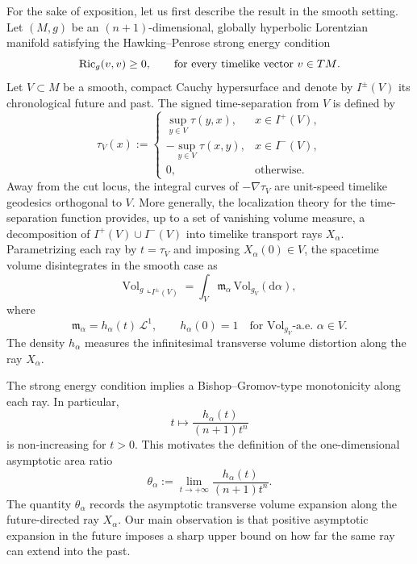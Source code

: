 \documentclass[a4paper,10pt]{article}
\newcommand{\Ric}{{\rm Ric}}
\newcommand{\vol}{\mathrm{Vol}}
\theoremstyle{plain}
\theoremstyle{definition}
\numberwithin{equation}{section}
\begin{document}
For the sake of exposition, let us first describe the result in the smooth
setting. Let $(M,g)$ be an $(n+1)$-dimensional, globally hyperbolic
Lorentzian manifold satisfying the Hawking--Penrose strong energy
condition
\begin{equation}\label{eq:SEC-Intro}
\Ric_g(v,v)\ge 0,
\qquad
\text{for every timelike vector $v\in TM$}.
\end{equation}
Let $V\subset M$ be a smooth, compact Cauchy hypersurface and denote by
$I^\pm(V)$ its chronological future and past. The signed time-separation
from $V$ is defined by
\begin{equation}\label{eq:deftauV-intro}
\tau_V(x):=
\begin{cases}
\sup_{y\in V}\tau(y,x), & x\in I^+(V),\\
-\sup_{y\in V}\tau(x,y), & x\in I^-(V),\\
0, & \text{otherwise}.
\end{cases}
\end{equation}
Away from the cut locus, the integral curves of $-\nabla\tau_V$ are
unit-speed timelike geodesics orthogonal to $V$. More generally, the
localization theory for the time-separation function provides, up to a set
of vanishing volume measure, a decomposition of $I^+(V)\cup I^-(V)$ into
timelike transport rays $X_\alpha$. Parametrizing each ray by
$t=\tau_V$ and imposing $X_\alpha(0)\in V$, the spacetime volume
disintegrates in the smooth case as
\begin{equation}\label{eq:DisintVolvSmooth-Intro}
\vol_g\llcorner_{I^\pm(V)}
=
\int_V \mathfrak m_\alpha\,\vol_{g_V}(\mathrm d\alpha),
\end{equation}
where
\begin{equation}\label{eq:malpha-Intro}
\mathfrak m_\alpha
=
h_\alpha(t)\,\mathcal L^1,
\qquad
h_\alpha(0)=1
\quad
\text{for $\vol_{g_V}$-a.e.\ $\alpha\in V$}.
\end{equation}
The density $h_\alpha$ measures the infinitesimal transverse volume
distortion along the ray $X_\alpha$.

The strong energy condition implies a Bishop--Gromov-type monotonicity
along each ray. In particular,
\[
t\longmapsto
\frac{h_\alpha(t)}{(n+1)t^n}
\]
is non-increasing for $t>0$. This motivates the definition of the
one-dimensional asymptotic area ratio
\begin{equation}\label{eq:defthetaalpha-intro}
\theta_\alpha
:=
\lim_{t\to+\infty}
\frac{h_\alpha(t)}{(n+1)t^n}.
\end{equation}
The quantity $\theta_\alpha$ records the asymptotic transverse volume
expansion along the future-directed ray $X_\alpha$. Our main observation is
that positive asymptotic expansion in the future imposes a sharp upper
bound on how far the same ray can extend into the past.
\end{document}
